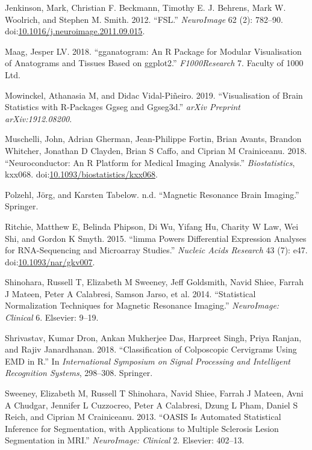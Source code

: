 \documentclass[]{elsarticle} %
\begin{document}
\hypertarget{ref-fsl}{}
Jenkinson, Mark, Christian F. Beckmann, Timothy E. J. Behrens, Mark W.
Woolrich, and Stephen M. Smith. 2012. ``FSL.'' \emph{NeuroImage} 62 (2):
782--90.
doi:\href{https://doi.org/10.1016/j.neuroimage.2011.09.015}{10.1016/j.neuroimage.2011.09.015}.

\hypertarget{ref-maag2018gganatogram}{}
Maag, Jesper LV. 2018. ``gganatogram: An R Package for Modular
Visualisation of Anatograms and Tissues Based on ggplot2.''
\emph{F1000Research} 7. Faculty of 1000 Ltd.

\hypertarget{ref-mowinckel2019visualisation}{}
Mowinckel, Athanasia M, and Didac Vidal-Piñeiro. 2019. ``Visualisation
of Brain Statistics with R-Packages Ggseg and Ggseg3d.'' \emph{arXiv
Preprint arXiv:1912.08200}.

\hypertarget{ref-neuroconductor}{}
Muschelli, John, Adrian Gherman, Jean-Philippe Fortin, Brian Avants,
Brandon Whitcher, Jonathan D Clayden, Brian S Caffo, and Ciprian M
Crainiceanu. 2018. ``Neuroconductor: An R Platform for Medical Imaging
Analysis.'' \emph{Biostatistics}, kxx068.
doi:\href{https://doi.org/10.1093/biostatistics/kxx068}{10.1093/biostatistics/kxx068}.

\hypertarget{ref-polzehlmagnetic}{}
Polzehl, Jörg, and Karsten Tabelow. n.d. ``Magnetic Resonance Brain
Imaging.'' Springer.

\hypertarget{ref-limma}{}
Ritchie, Matthew E, Belinda Phipson, Di Wu, Yifang Hu, Charity W Law,
Wei Shi, and Gordon K Smyth. 2015. ``limma Powers Differential
Expression Analyses for RNA-Sequencing and Microarray Studies.''
\emph{Nucleic Acids Research} 43 (7): e47.
doi:\href{https://doi.org/10.1093/nar/gkv007}{10.1093/nar/gkv007}.

\hypertarget{ref-shinohara2014statistical}{}
Shinohara, Russell T, Elizabeth M Sweeney, Jeff Goldsmith, Navid Shiee,
Farrah J Mateen, Peter A Calabresi, Samson Jarso, et al. 2014.
``Statistical Normalization Techniques for Magnetic Resonance Imaging.''
\emph{NeuroImage: Clinical} 6. Elsevier: 9--19.

\hypertarget{ref-shrivastav2018classification}{}
Shrivastav, Kumar Dron, Ankan Mukherjee Das, Harpreet Singh, Priya
Ranjan, and Rajiv Janardhanan. 2018. ``Classification of Colposcopic
Cervigrams Using EMD in R.'' In \emph{International Symposium on Signal
Processing and Intelligent Recognition Systems}, 298--308. Springer.

\hypertarget{ref-sweeney2013oasis}{}
Sweeney, Elizabeth M, Russell T Shinohara, Navid Shiee, Farrah J Mateen,
Avni A Chudgar, Jennifer L Cuzzocreo, Peter A Calabresi, Dzung L Pham,
Daniel S Reich, and Ciprian M Crainiceanu. 2013. ``OASIS Is Automated
Statistical Inference for Segmentation, with Applications to Multiple
Sclerosis Lesion Segmentation in MRI.'' \emph{NeuroImage: Clinical} 2.
Elsevier: 402--13.
\end{document}
